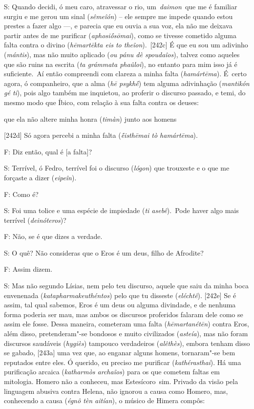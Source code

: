 S: Quando decidi, ó meu caro, atravessar o rio, um~\emph{daimon}~que me
é familiar surgiu e me gerou um sinal (\emph{sêmeîón}) -- ele sempre me
impede quando estou prestes a fazer algo \mbox{---,} e parecia que eu ouvia a
sua voz, ela não me deixava partir antes de me purificar
(\emph{aphosiṓsōmai}), como se tivesse cometido alguma falta contra o
divino (\emph{hēmartēkta eis to theîon}).~[242c] É que eu sou um
adivinho (\emph{mántis}), mas não muito aplicado (\emph{ou pánu dè
spoudaîos}), talvez como aqueles que são ruins na escrita (\emph{ta
grámmata phaûloi}), no entanto para mim isso já é suficiente.~Aí então
compreendi com clareza a minha falta (\emph{hamártēma}). É~certo agora,
ó companheiro, que a alma (\emph{hē psykhḗ}) tem alguma adivinhação
(\emph{mantikón gé ti}), pois algo também me inquietou, ao proferir o
discurso passado, e temi, do mesmo modo que Íbico, com relação à sua
falta contra os deuses:

 

que ela não altere minha honra (\emph{timàn}) junto aos homens

 

[242d] Só agora percebi a minha falta (\emph{ḗisthēmai tò
hamártēma}).

 

F: Diz então, qual é [a falta]?

 

S: Terrível, ó Fedro, terrível foi o discurso (\emph{lógon}) que
trouxeste e o que me forçaste a dizer (\emph{eipeîn}).

 

F: Como é?

 

S: Foi uma tolice e uma espécie de impiedade (\emph{ti asebê}).~Pode
haver algo mais terrível (\emph{deinóteros})?

 

F: Não, se é que dizes a verdade.

 

S: O quê? Não consideras que o Eros é um deus, filho de Afrodite?

 

F: Assim dizem.

 

S: Mas não segundo Lísias, nem pelo teu discurso, aquele que saiu da
minha boca envenenada (\emph{katapharmakeuthéntos}) pelo que tu disseste
(\emph{eléchtê}). [242e] Se é assim, tal qual sabemos, Eros é um
deus ou alguma divindade, e de nenhuma forma poderia ser mau, mas ambos
os discursos proferidos falaram dele como se assim ele fosse. Dessa
maneira, cometeram uma falta (\emph{hēmartanétēn}) contra Eros, além
disso, pretenderam"-se bondosos e muito civilizados (\emph{asteía}), mas
não foram discursos saudáveis (\emph{hygiès}) tampouco verdadeiros
(\emph{alêthès}), embora tenham disso se gabado, [243a] uma vez que,
ao enganar alguns homens, tornaram"-se bem reputados entre eles. Ó
querido, eu preciso me purificar (\emph{kathérasthai}). Há uma
purificação arcaica (\emph{katharmòs archaîos}) para os que cometem
faltas em mitologia. Homero não a conheceu, mas Estesícoro~sim. Privado
da visão pela linguagem abusiva contra Helena, não ignorou a causa como
Homero, mas, conhecendo a causa (\emph{égnô tèn aitían}), o músico de
Himera compôs:

